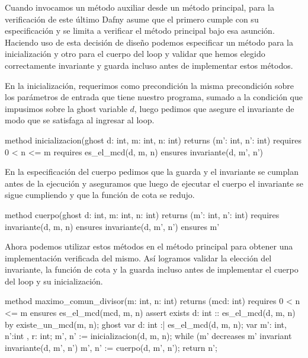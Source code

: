 \documentclass[12pt, a4paper, openany, fleqn]{book}
\begin{document}
    Cuando invocamos un método auxiliar desde un método principal, para la verificación de este último Dafny asume que el primero cumple con su especificación y se limita a verificar el método principal bajo esa asunción. Haciendo uso de esta decisión de diseño podemos especificar un método para la inicialización y otro para el cuerpo del loop y validar que hemos elegido correctamente invariante y guarda incluso antes de implementar estos métodos.

    En la inicialización, requerimos como precondición la misma precondición sobre los parámetros de entrada que tiene nuestro programa, sumado a la condición que impusimos sobre la ghost variable $d$, luego pedimos que asegure el invariante de modo que se satisfaga al ingresar al loop.
    
    \begin{dafny}
method inicializacion(ghost d: int, m: int, n: int)
    returns (m': int, n': int)
    requires 0 < n <= m
    requires es_el_mcd(d, m, n)
    ensures invariante(d, m', n')
    \end{dafny}

    En la especificación del cuerpo pedimos que la guarda y el invariante se cumplan antes de la ejecución y aseguramos que luego de ejecutar el cuerpo el invariante se sigue cumpliendo y que la función de cota se redujo.

    \begin{dafny}
method cuerpo(ghost d: int, m: int, n: int)
    returns (m': int, n': int)
    requires invariante(d, m, n)
    ensures invariante(d, m', n')
    ensures m' %
    \end{dafny}

    Ahora podemos utilizar estos métodos en el método principal para obtener una implementación verificada del mismo. Así logramos validar la elección del invariante, la función de cota y la guarda incluso antes de implementar el cuerpo del loop y su inicialización.

    \begin{dafny}
method maximo_comun_divisor(m: int, n: int) returns (mcd: int)
    requires 0 < n <= m
    ensures es_el_mcd(mcd, m, n)
{
    assert exists d: int :: es_el_mcd(d, m, n) by {
        existe_un_mcd(m, n);
    }
    ghost var d: int :| es_el_mcd(d, m, n);
    var m': int, n':int , r: int;
    m', n' := inicializacion(d, m, n);
    while (m' %
        decreases m' %
        invariant invariante(d, m', n')
    {
         m', n' := cuerpo(d, m', n');
    }
    return n';
}
    \end{dafny}
\end{document}
